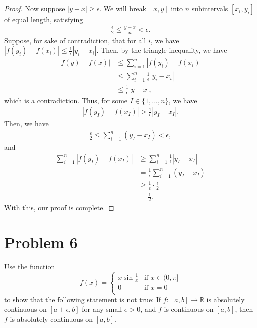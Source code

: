 \documentclass[10pt,a4paper]{article}
\theoremstyle{theorem}
\theoremstyle{definition}
\begin{document}
\begin{proof}
Now suppose $|y - x| \geq \epsilon$. We will break $[x, y]$ into $n$ subintervals $[x_i, y_i]$ of equal length, satisfying
\begin{align*}
\frac{\epsilon}{2} \leq \frac{y - x}{n} < \epsilon.
\end{align*}
Suppose, for sake of contradiction, that for all $i$, we have $|f(y_i) - f(x_i)| \leq \frac{1}{\epsilon}|y_i - x_i|$. Then, by the triangle inequality, we have
\begin{align*}
|f(y) - f(x)| &\leq \sum_{i=1}^n |f(y_i) - f(x_i)|\\
&\leq \sum_{i=1}^n \frac{1}{\epsilon}|y_i - x_i|\\
&\leq \frac{1}{\epsilon}|y - x|,
\end{align*}
which is a contradiction. Thus, for some $I \in \{1, ..., n\}$, we have
\begin{align*}
|f(y_I) - f(x_I)| > \frac{1}{\epsilon}|y_I - x_I|.
\end{align*}
Then, we have
\begin{align*}
\frac{\epsilon}{2} \leq \sum_{i=1}^n (y_I - x_I) < \epsilon,
\end{align*}
and
\begin{align*}
\sum_{i=1}^n |f(y_I) - f(x_I)| &\geq \sum_{i=1}^n \frac{1}{\epsilon}|y_I - x_I|\\
&= \frac{1}{\epsilon} \sum_{i=1}^n (y_I - x_I)\\
&\geq \frac{1}{\epsilon} \cdot \frac{\epsilon}{2}\\
&= \frac{1}{2}.
\end{align*}
With this, our proof is complete.
\end{proof}

\section*{Problem 6}
Use the function 
\[   f(x) = \left\{
\begin{array}{ll}
      x \sin \frac{1}{x} & \text{if } x \in (0, \pi] \\
      0 & \text{if } x = 0\\
\end{array} 
\right. \]
to show that the following statement is not true: If $f:[a, b] \to \mathbb{R}$ is absolutely continuous on $[a + \epsilon, b]$ for any small $\epsilon > 0$, and $f$ is continuous on $[a, b]$, then $f$ is absolutely continuous on $[a, b]$.
\end{document}
